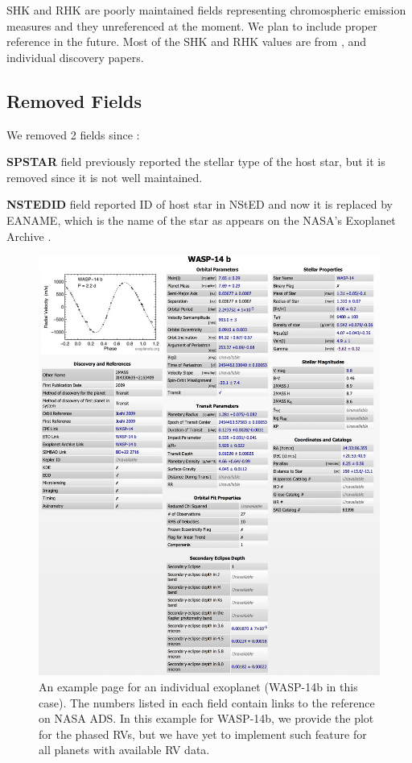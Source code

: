 \documentclass[11pt,preprint]{aastex}
\begin{document}
\begin{CJK*}{UTF8}{gbsn}
SHK and RHK are poorly maintained fields representing chromospheric emission measures and they unreferenced at the
moment. We plan to include proper reference in the future. Most of the
SHK and RHK values are from \cite{Butler2006}, and individual discovery papers.

\subsection{Removed Fields}\label{sec:removed}

We removed 2 fields since \cite{Wright2011}:

{\bf SPSTAR} field previously reported the stellar type of the host
star, but it is removed since it is not well maintained. 

{\bf NSTEDID} field reported ID of host star in NStED and now it is
replaced by EANAME, which is the name of the star as appears on the
NASA's Exoplanet Archive \citep{Akeson2013}. 


\begin{figure}[!htb]
\centering
\includegraphics[width=\textwidth]{../fig/wasp-14b.eps}
\caption{An example page for an individual exoplanet (WASP-14b in this
  case). The numbers listed in each field contain links to the
  reference on NASA ADS. In this example for WASP-14b, we provide the plot
  for the phased RVs, but we have yet to implement such feature for all
  planets with available RV data.}
\label{fig:individual}
\end{figure}



\end{CJK*}
\end{document}
